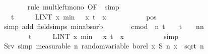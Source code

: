 \documentclass{svjour3}
\begin{document}
{\begin{isabellebody}
\ \ \ \ \ \ \isamarkupfalse%
\ {\isacharparenleft}rule\ mult{\isacharunderscore}left{\isacharunderscore}mono\ {\isacharbrackleft}OF\ {\isacharasterisk}{\isacharasterisk}{\isacharbrackright}{\isacharcomma}\ simp{\isacharparenright}\isanewline
\ \ \ \ \isamarkupfalse%
\ \isamarkupfalse%
\ {\isachardoublequoteopen}{\isasymdots}\ {\isacharequal}\ {\isacharparenleft}t\ {\isacharslash}\ {\isacharparenleft}{}\ {\isacharasterisk}\ {\isasymsigma}\ {\isacharasterisk}\ {\isacharparenleft}LINT\ x{\isacharbar}{\isasymmu}{\isachardot}\ min\ {\isacharparenleft}{}\ {\isacharasterisk}\ x\ {\isacharparenleft}{\isasymbar}{\isacharquery}t{\isasymbar}\ {\isacharasterisk}\ {\isasymbar}x{\isasymbar}\ {\isacharcircum}\ {}{\isacharparenright}{\isacharparenright}{\isacharparenright}{\isachardoublequoteclose}\ \isanewline
\ \ \ \ \ \ \isamarkupfalse%
\ {\isasymsigma}{\isacharunderscore}pos\ \isamarkupfalse%
\ {\isacharparenleft}simp\ add{\isacharcolon}\ field{\isacharunderscore}simps\ min{\isacharunderscore}absorb{}{\isacharparenright}\isanewline
\ \ \ \ \isamarkupfalse%
\ \isamarkupfalse%
\ {\isachardoublequoteopen}cmod\ {\isacharparenleft}{\isasymphi}\ n\ t\ {\isacharminus}\ {\isacharparenleft}{}\ {\isacharplus}\ {\isacharparenleft}{\isacharminus}{\isacharparenleft}t{\isacharcircum}{}{\isacharparenright}\ {\isacharslash}\ {}{\isacharparenright}\ {\isacharslash}\ n{\isacharparenright}{\isacharcircum}n{\isacharparenright}\ {\isasymle}\ \isanewline
\ \ \ \ \ \ \ \ {\isacharparenleft}t\ {\isacharslash}\ {\isacharparenleft}{}\ {\isacharasterisk}\ {\isasymsigma}\ {\isacharasterisk}\ {\isacharparenleft}LINT\ x{\isacharbar}{\isasymmu}{\isachardot}\ min\ {\isacharparenleft}{}\ {\isacharasterisk}\ x\ {\isacharparenleft}{\isasymbar}{\isacharquery}t{\isasymbar}\ {\isacharasterisk}\ {\isasymbar}x{\isasymbar}\ {\isacharcircum}\ {}{\isacharparenright}{\isacharparenright}{\isacharparenright}{\isachardoublequoteclose}\ \isanewline
\ \ \ \ \ \ \isamarkupfalse%
\ simp\isanewline
\ \ \isamarkupfalse%
\isanewline
\isanewline
\ \ \isamarkupfalse%
\ S{\isacharunderscore}rv\ {\isacharbrackleft}simp{\isacharcomma}\ measurable{\isacharbrackright}{\isacharcolon}\ {\isachardoublequoteopen}{\isasymAnd}n{\isachardot}\ random{\isacharunderscore}variable\ borel\ {\isacharparenleft}{\isasymlambda}x{\isachardot}\ S\ n\ x\ {\isacharslash}\ sqrt\ {\isacharparenleft}n\ {\isacharasterisk}\ {\isasymsigma}\isanewline

\end{isabellebody}}
\end{document}
